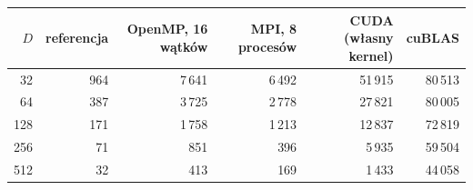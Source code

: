 \begin{tabular}{rrrrrr}
\toprule
$D$ & referencja & OpenMP, 16 wątków & MPI, 8 procesów & CUDA (własny kernel) & cuBLAS \\
\midrule
32 & 964 & 7\,641 & 6\,492 & 51\,915 & 80\,513 \\
64 & 387 & 3\,725 & 2\,778 & 27\,821 & 80\,005 \\
128 & 171 & 1\,758 & 1\,213 & 12\,837 & 72\,819 \\
256 & 71 & 851 & 396 & 5\,935 & 59\,504 \\
512 & 32 & 413 & 169 & 1\,433 & 44\,058 \\
\bottomrule
\end{tabular}
